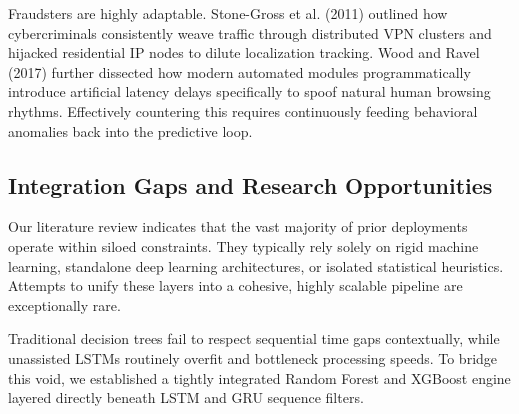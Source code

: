 \documentclass[conference]{IEEEtran}
\begin{document}
Fraudsters are highly adaptable. Stone-Gross et al. (2011) \cite{b4} outlined how cybercriminals consistently weave traffic through distributed VPN clusters and hijacked residential IP nodes to dilute localization tracking. Wood and Ravel (2017) \cite{b3} further dissected how modern automated modules programmatically introduce artificial latency delays specifically to spoof natural human browsing rhythms. Effectively countering this requires continuously feeding behavioral anomalies back into the predictive loop.

\subsection{Integration Gaps and Research Opportunities}
Our literature review indicates that the vast majority of prior deployments operate within siloed constraints. They typically rely solely on rigid machine learning, standalone deep learning architectures, or isolated statistical heuristics. Attempts to unify these layers into a cohesive, highly scalable pipeline are exceptionally rare.

Traditional decision trees fail to respect sequential time gaps contextually, while unassisted LSTMs routinely overfit and bottleneck processing speeds. To bridge this void, we established a tightly integrated Random Forest and XGBoost engine layered directly beneath LSTM and GRU sequence filters.
\end{document}
